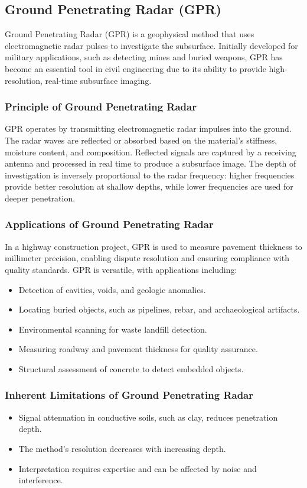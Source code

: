 \documentclass[12pt,a4paper]{report}
\begin{document}
\subsection{Ground Penetrating Radar (GPR)}
Ground Penetrating Radar (GPR) is a geophysical method that uses electromagnetic radar pulses to investigate the subsurface. Initially developed for military applications, such as detecting mines and buried weapons, GPR has become an essential tool in civil engineering due to its ability to provide high-resolution, real-time subsurface imaging.

\subsubsection{Principle of Ground Penetrating Radar}
GPR operates by transmitting electromagnetic radar impulses into the ground. The radar waves are reflected or absorbed based on the material's stiffness, moisture content, and composition. Reflected signals are captured by a receiving antenna and processed in real time to produce a subsurface image. The depth of investigation is inversely proportional to the radar frequency: higher frequencies provide better resolution at shallow depths, while lower frequencies are used for deeper penetration.

\subsubsection{Applications of Ground Penetrating Radar}
In a highway construction project, GPR is used to measure pavement thickness to millimeter precision, enabling dispute resolution and ensuring compliance with quality standards. GPR is versatile, with applications including:
\begin{itemize}
    \item Detection of cavities, voids, and geologic anomalies.
    \item Locating buried objects, such as pipelines, rebar, and archaeological artifacts.
    \item Environmental scanning for waste landfill detection.
    \item Measuring roadway and pavement thickness for quality assurance.
    \item Structural assessment of concrete to detect embedded objects.
\end{itemize}

\subsubsection{Inherent Limitations of Ground Penetrating Radar}
\begin{itemize}
    \item Signal attenuation in conductive soils, such as clay, reduces penetration depth.
    \item The method's resolution decreases with increasing depth.
    \item Interpretation requires expertise and can be affected by noise and interference.
\end{itemize}
\end{document}
